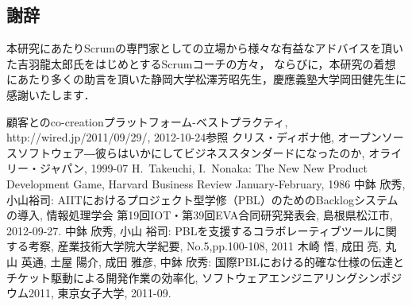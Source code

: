 \documentclass[a4j,twoside]{jarticle}
\newcommand{\me}{中鉢 欣秀}
\begin{document}
\begin{multicols}{2}
\section*{謝辞}
    本研究にあたりScrumの専門家としての立場から様々な有益なアドバイスを頂いた吉羽龍太郎氏をはじめとするScrumコーチの方々，
    ならびに，本研究の着想にあたり多くの助言を頂いた静岡大学松澤芳昭先生，慶應義塾大学岡田健先生に感謝いたします．
	\vspace{\baselineskip}
	\begin{thebibliography}{99}
		 顧客とのco-creationプラットフォーム-ベストプラクティ, 
                        http://wired.jp/2011/09/29/,  2012-10-24参照
         クリス・ディボナ他, オープンソースソフトウェア―彼らはいかにしてビジネススタンダードになったのか,
        				オライリー・ジャパン, 1999-07
		 H.~Takeuchi, I.~Nonaka: The New New Product Development Game, Harvard Business Review January-February, 1986
		 \me, 小山裕司: AIITにおけるプロジェクト型学修（PBL）のためのBacklogシステムの導入, 情報処理学会 第19回IOT・第39回EVA合同研究発表会, 島根県松江市, 2012-09-27. 
		\me, 小山 裕司: PBLを支援するコラボレーティブツールに関する考察, 産業技術大学院大学紀要, No.5,pp.100-108, 2011 
		 木崎 悟, 成田 亮, 丸山 英通, 土屋 陽介, 成田 雅彦, \me: 国際PBLにおける的確な仕様の伝達とチケット駆動による開発作業の効率化, ソフトウェアエンジニアリングシンポジウム2011, 東京女子大学, 2011-09.

\end{thebibliography}
\end{multicols}
\end{document}
